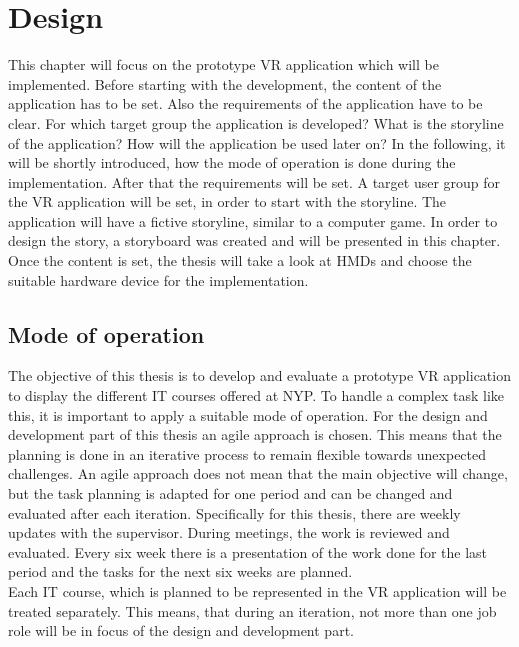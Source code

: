 \chapter{Design} \label{design}
This chapter will focus on the prototype VR application which will be implemented. Before starting with the development, the content of the  application has to be set. Also the requirements of the application have to be clear. For which target group the application is developed? What is the storyline of the application? How will the application be used later on? In the following, it will be shortly introduced, how the mode of operation is done during the implementation. After that the requirements will be set. A target user group for the VR application will be set, in order to start with the storyline. The application will have a fictive storyline, similar to a computer game. In order to design the story, a storyboard was created and will be presented in this chapter. Once the content is set, the thesis will take a look at HMDs and choose the suitable hardware device for the implementation.
\section{Mode of operation}
The objective of this thesis is to develop and evaluate a prototype VR application to display the different IT courses offered at NYP. To handle a complex task like this, it is important to apply a suitable mode of operation. For the design and development part of this thesis an agile approach is chosen. This means that the planning is done in an iterative process to remain flexible towards unexpected challenges. An agile approach does not mean that the main objective will change, but the task planning is adapted for one period and can be changed and evaluated after each iteration. Specifically for this thesis, there are weekly updates with the supervisor. During meetings, the work is reviewed and evaluated. Every six week there is a presentation of the work done for the last period and the tasks for the next six weeks are planned.\\
Each IT course, which is planned to be represented in the VR application will be treated separately. This means, that during an iteration, not more than one job role will be in focus of the design and development part.  


